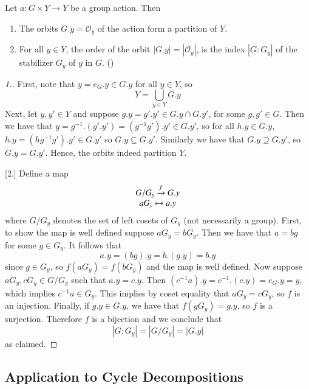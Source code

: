 \documentclass[12pt, a4paper, oneside, openright, titlepage]{book}
\begin{document}
\begin{lem}
        Let $a:G\times Y \rightarrow Y$ be a group action. Then \begin{enumerate}
                \item The orbits $G.y = \mathcal{O}_y$ of the action form a partition of $Y$.
                \item For all $y \in Y$, the order of the orbit $|G.y| = |\mathcal{O}_y|$, is the index $|G:G_y|$ of the stabilizer $G_y$ of $y$ in $G$. ()
        \end{enumerate}
\end{lem}
\begin{proof}
        [1.] First, note that $y = e_G.y \in G.y$ for all $y \in Y$, so \begin{equation}
                Y = \bigcup_{y \in Y}G.y
        \end{equation}
        Next, let $y,y' \in Y$ and suppose $g.y = g'.y' \in G.y \cap G.y'$, for some $g,g' \in G$. Then we have that $y = g^{-1}.(g'.y') = (g^{-1}g').y' \in G.y'$, so for all $h.y \in G.y$, $h.y = (hg^{-1}g').y' \in G.y'$ so $G.y \subseteq G.y'$. Similarly we have that $G.y \supseteq G.y'$, so $G.y = G.y'$. Hence, the orbits indeed partition $Y$.


        [2.] Define a map \begin{equation}
                \begin{array}{c} G/G_y\xrightarrow{f} G.y \\ aG_y\mapsto a.y \end{array}
        \end{equation}
        where $G/G_y$ denotes the set of left cosets of $G_y$ (not necessarily a group). First, to show the map is well defined suppose $aG_y = bG_y$. Then we have that $a = bg$ for some $g \in G_y$. It follows that $$a.y = (bg).y = b.(g.y) = b.y$$ since $g \in G_y$, so $f(aG_y) = f(bG_y)$ and the map is well defined. Now suppose $aG_y, cG_y \in G/G_y$ such that $a.y = c.y$. Then $(c^{-1}a).y = c^{-1}.(c.y) = e_G.y = y$, which implies $c^{-1}a \in G_y$. This implies by coset equality that $aG_y = cG_y$, so $f$ is an injection. Finally, if $g.y \in G.y$, we have that $f(gG_y) = g.y$, so $f$ is a surjection. Therefore $f$ is a bijection and we conclude that \begin{equation}
                |G:G_y| = |G/G_y| = |G.y|
        \end{equation}
        as claimed.
\end{proof}


\subsection{\textsection Application to Cycle Decompositions}
\end{document}
